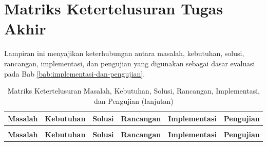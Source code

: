 \chapter{Matriks Ketertelusuran Tugas Akhir}
\label{lampiran:matriks-ketertelusuran-ta}

Lampiran ini menyajikan keterhubungan antara masalah, kebutuhan, solusi, rancangan, implementasi, dan pengujian yang digunakan sebagai dasar evaluasi pada Bab \ref{bab:implementasi-dan-pengujian}.

\begingroup
\scriptsize
\setlength{\tabcolsep}{3pt}
\renewcommand{\arraystretch}{1.15}
\begin{longtable}{|p{}|p{}|p{}|p{}|p{}|p{}|}
	\caption{Matriks Ketertelusuran Masalah, Kebutuhan, Solusi, Rancangan, Implementasi, dan Pengujian}
	\label{tab:matriks-ketertelusuran-ta}                                                                                                                                                                                                                                                                                                                                                                                                                                              \\
	\hline
	\textbf{Masalah} & \textbf{Kebutuhan}                                                                                                  & \textbf{Solusi}                    & \textbf{Rancangan}                                   & \textbf{Implementasi}                                                  & \textbf{Pengujian}                                                                                                                                                   \\ \hline
	\endfirsthead

	\caption[]{Matriks Ketertelusuran Masalah, Kebutuhan, Solusi, Rancangan, Implementasi, dan Pengujian (lanjutan)}                                                                                                                                                                                                                                                                                                                                                                   \\
	\hline
	\textbf{Masalah} & \textbf{Kebutuhan}                                                                                                  & \textbf{Solusi}                    & \textbf{Rancangan}                                   & \textbf{Implementasi}                                                  & \textbf{Pengujian}                                                                                                                                                   \\ \hline
	\endhead


\end{longtable}
